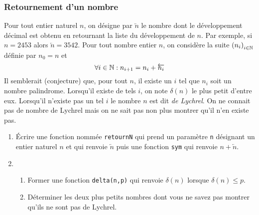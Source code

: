 \subsubsection{Retournement d'un nombre}
Pour tout entier naturel $n$, on désigne par $\overleftarrow{n}$ le nombre dont le développement décimal est obtenu en retournant la liste du développement de $n$. Par exemple, si $n = 2453$ alors $\overleftarrow{n}=3542$.\newline
Pour tout nombre entier $n$, on considère la suite $\left( n_i \right)_{i\in\mathbb{N}}$ définie par $n_0 = n$ et 
\begin{displaymath}
  \forall i\in \mathbb{N} : n_{i+1} = n_i + \overleftarrow{n_i}
\end{displaymath}
Il semblerait (conjecture) que, pour tout $n$, il existe un $i$ tel que $n_i$ soit un nombre palindrome. Lorsqu'il existe de tels $i$, on note $\delta(n)$ le plus petit d'entre eux. Lorsqu'il n'existe pas un tel $i$ le nombre $n$ est dit \emph{de Lychrel}. On ne connait pas de nombre de Lychrel mais on ne sait pas non plus montrer qu'il n'en existe pas.
\begin{enumerate}
\item \'Ecrire une fonction nommée \verb|retournN| qui prend un paramètre \verb|n| désignant un entier naturel $n$ et qui renvoie $\overleftarrow{n}$ puis une fonction \verb|sym| qui renvoie $n+\overleftarrow{n}$.
\item 
\begin{enumerate}
 \item Former une fonction \verb|delta(n,p)| qui renvoie $\delta(n)$ lorsque $\delta(n)\leq p$. 
 \item Déterminer les deux plus petits nombres dont vous ne savez pas montrer qu'ils ne sont pas de Lychrel.
\end{enumerate}
\end{enumerate}
